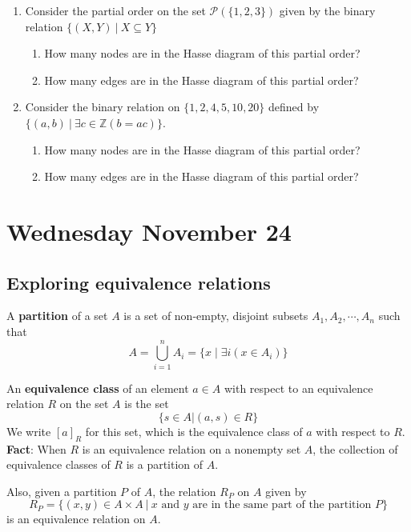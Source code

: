 \documentclass[12pt, oneside]{article}
\begin{document}
\begin{enumerate}
\begin{enumerate}
\item Consider the partial order on the set $\mathcal{P}(\{1,2,3\})$ given by the binary relation 
    $\{ (X,Y) ~|~X \subseteq Y \}$
    \begin{enumerate}
    \item How many nodes are in the Hasse diagram of this partial order?
    \item How many edges are in the Hasse diagram of this partial order?
    \end{enumerate}
\item Consider the binary relation on $\{1,2,4,5,10,20\}$ 
defined by $\{(a,b) ~|~ \exists c \in \mathbb{Z} ( b = ac)\}$.
    \begin{enumerate}
    \item How many nodes are in the Hasse diagram of this partial order?
    \item How many edges are in the Hasse diagram of this partial order?
    \end{enumerate}
\end{enumerate} \end{enumerate}
\newpage

\section*{Wednesday November 24}
\subsection*{Exploring equivalence relations}


A {\bf partition} of a set $A$ is a set of non-empty, disjoint subsets 
$A_1, A_2, \cdots, A_n$ such that 
\[
    A = \bigcup_{i=1}^{n} A_i = \{ x \mid \exists i (x \in A_i) \}
\] 

An {\bf equivalence class} of an element $a \in A$ 
with respect to an equivalence relation $R$ on the set $A$ is the set 
\[
    \{s \in A | (a, s) \in R \}
\] 
We write $[a]_R$ for this set, which is the equivalence class of $a$ with respect to $R$. 
{\bf Fact}: When $R$ is an equivalence relation on a nonempty set $A$, 
the collection of equivalence classes of $R$ is a partition of $A$.

Also, given a partition $P$ of $A$, the relation $R_P$ on $A$ given by 
\[
    R_P = \{ (x,y) \in A \times A ~|~ \text{$x$ and $y$ are in the same part of the partition $P$}\}
\]
is an equivalence relation on $A$. 
\end{document}
